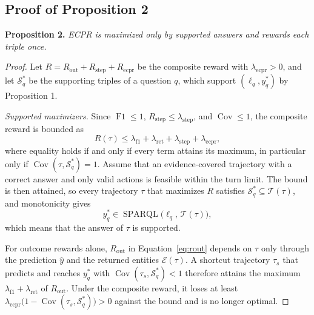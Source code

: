 \subsection{Proof of Proposition 2}
\label{app:proof2}
\textbf{Proposition 2.} \textit{ECPR is maximized only by supported answers and rewards each triple once.}\vspace{-2mm}
\begin{proof}
Let $R=R_{\text{out}}+R_{\text{step}}+R_{\text{ecpr}}$ be the composite reward with $\lambda_{\text{ecpr}}>0$, and let $\mathcal{S}^{*}_{q}$ be the supporting triples of a question $q$, which support $(\ell_q,y_q^{*})$ by Proposition 1.

\textit{Supported maximizers.} Since $\operatorname{F1}\le 1$, $R_{\text{step}}\le\lambda_{\text{step}}$, and $\operatorname{Cov}\le 1$, the composite reward is bounded as
\begin{equation}
    R(\tau)\le\lambda_{\text{f1}}+\lambda_{\text{ret}}+\lambda_{\text{step}}+\lambda_{\text{ecpr}},
\end{equation}
where equality holds if and only if every term attains its maximum, in particular only if $\operatorname{Cov}(\tau,\mathcal{S}^{*}_{q})=1$. Assume that an evidence-covered trajectory with a correct answer and only valid actions is feasible within the turn limit. The bound is then attained, so every trajectory $\tau$ that maximizes $R$ satisfies $\mathcal{S}^{*}_{q}\subseteq\mathcal{T}(\tau)$, and monotonicity gives
\begin{equation}
    y_q^{*}\in\operatorname{SPARQL}\bigl(\ell_q,\,\mathcal{T}(\tau)\bigr),
\end{equation}
which means that the answer of $\tau$ is supported.

For outcome rewards alone, $R_{\text{out}}$ in Equation~\ref{eq:rout} depends on $\tau$ only through the prediction $\hat{y}$ and the returned entities $\mathcal{E}(\tau)$. A shortcut trajectory $\tau_s$ that predicts and reaches $y_q^{*}$ with $\operatorname{Cov}(\tau_s,\mathcal{S}^{*}_{q})<1$ therefore attains the maximum $\lambda_{\text{f1}}+\lambda_{\text{ret}}$ of $R_{\text{out}}$. Under the composite reward, it loses at least $\lambda_{\text{ecpr}}\bigl(1-\operatorname{Cov}(\tau_s,\mathcal{S}^{*}_{q})\bigr)>0$ against the bound and is no longer optimal.


\end{proof}
